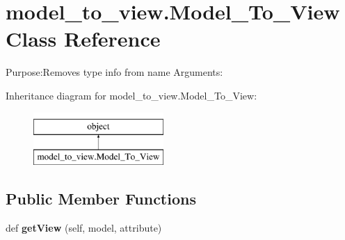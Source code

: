 \hypertarget{classmodel__to__view_1_1Model__To__View}{}\section{model\+\_\+to\+\_\+view.\+Model\+\_\+\+To\+\_\+\+View Class Reference}
\label{classmodel__to__view_1_1Model__To__View}


Purpose\+:Removes type info from name Arguments\+:  


Inheritance diagram for model\+\_\+to\+\_\+view.\+Model\+\_\+\+To\+\_\+\+View\+:\begin{figure}[H]
\begin{center}
\leavevmode
\includegraphics[height=2.000000cm]{classmodel__to__view_1_1Model__To__View}
\end{center}
\end{figure}
\subsection*{Public Member Functions}
\begin{DoxyCompactItemize}
\item 
\mbox{\label{classmodel__to__view_1_1Model__To__View_a9c1facf7be0e577615e2882403df13ad}} 
def {\bfseries get\+View} (self, model, attribute)
\end{DoxyCompactItemize}
